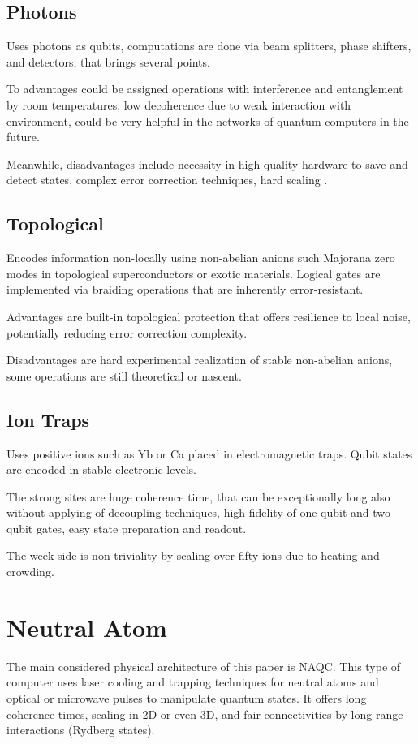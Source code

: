 \subsection{Photons}
Uses photons as qubits, computations are done via beam splitters, phase shifters, and detectors, that brings several points.

To advantages could be assigned operations with interference and entanglement by room temperatures,
low decoherence due to weak interaction with environment,
could be very helpful in the networks of quantum computers in the future.

Meanwhile, disadvantages include necessity in high-quality hardware to save and detect states,
complex error correction techniques, hard scaling
\parencite{romero2024photonicquantumcomputing}.

\subsection{Topological}
Encodes information non-locally using non-abelian anions such Majorana zero modes in topological superconductors 
or exotic materials. 
Logical gates are implemented via braiding operations that are inherently error-resistant.

Advantages are built-in topological protection that offers resilience to local noise, 
potentially reducing error correction complexity.

Disadvantages are hard experimental realization of stable non-abelian anions,
some operations are still theoretical or nascent.
\parencite{Lahtinen_2017, Zhang_2024}
\subsection{Ion Traps}
Uses positive ions such as Yb or Ca  placed in electromagnetic traps. 
Qubit states are encoded in stable electronic levels.

The strong sites are huge coherence time, that can be exceptionally long also without applying of decoupling techniques,
high fidelity of one-qubit and two-qubit gates, easy state preparation and readout.

The week side is non-triviality by scaling over fifty ions due to heating and crowding.
\parencite{Bruzewicz_2019}
\section{Neutral Atom}
The main considered physical architecture of this paper is \ac{NAQC}. 
This type of computer uses laser cooling and trapping techniques for neutral atoms and
optical or microwave pulses to manipulate quantum states.  
It offers long coherence times, scaling in 2D or even 3D,
and fair connectivities by long-range interactions (Rydberg states).
